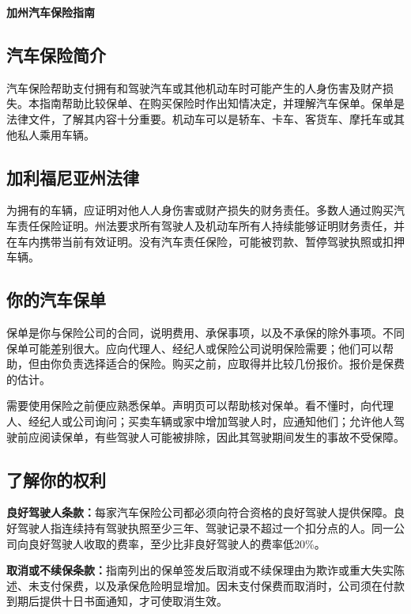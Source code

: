 \documentclass[UTF8,fontset=none,11pt,a4paper]{ctexart}
\begin{document}
{\noindent\fontsize{20}{25}\selectfont\bfseries 加州汽车保险指南\par}
\vspace{10pt}
\subsection*{汽车保险简介}
汽车保险帮助支付拥有和驾驶汽车或其他机动车时可能产生的人身伤害及财产损失。本指南帮助比较保单、在购买保险时作出知情决定，并理解汽车保单。保单是法律文件，了解其内容十分重要。机动车可以是轿车、卡车、客货车、摩托车或其他私人乘用车辆。


\subsection*{加利福尼亚州法律}
为拥有的车辆，应证明对他人人身伤害或财产损失的财务责任。多数人通过购买汽车责任保险证明。州法要求所有驾驶人及机动车所有人持续能够证明财务责任，并在车内携带当前有效证明。没有汽车责任保险，可能被罚款、暂停驾驶执照或扣押车辆。


\subsection*{你的汽车保单}
保单是你与保险公司的合同，说明费用、承保事项，以及不承保的除外事项。不同保单可能差别很大。应向代理人、经纪人或保险公司说明保险需要；他们可以帮助，但由你负责选择适合的保险。购买之前，应取得并比较几份报价。报价是保费的估计。


需要使用保险之前便应熟悉保单。声明页可以帮助核对保单。看不懂时，向代理人、经纪人或公司询问；买卖车辆或家中增加驾驶人时，应通知他们；允许他人驾驶前应阅读保单，有些驾驶人可能被排除，因此其驾驶期间发生的事故不受保障。


\subsection*{了解你的权利}
\textbf{良好驾驶人条款：}每家汽车保险公司都必须向符合资格的良好驾驶人提供保障。良好驾驶人指连续持有驾驶执照至少三年、驾驶记录不超过一个扣分点的人。同一公司向良好驾驶人收取的费率，至少比非良好驾驶人的费率低20\%。


\textbf{取消或不续保条款：}指南列出的保单签发后取消或不续保理由为欺诈或重大失实陈述、未支付保费，以及承保危险明显增加。因未支付保费而取消时，公司须在付款到期后提供十日书面通知，才可使取消生效。
\end{document}
